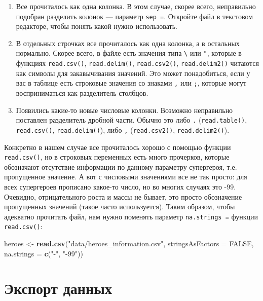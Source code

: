 \documentclass[
]{book}
\newenvironment{Shaded}{\begin{snugshade}}{\end{snugshade}}
\newcommand{\DataTypeTok}[1]{\textcolor[rgb]{0.13,0.29,0.53}{#1}}
\newcommand{\KeywordTok}[1]{\textcolor[rgb]{0.13,0.29,0.53}{\textbf{#1}}}
\newcommand{\NormalTok}[1]{#1}
\newcommand{\OtherTok}[1]{\textcolor[rgb]{0.56,0.35,0.01}{#1}}
\newcommand{\StringTok}[1]{\textcolor[rgb]{0.31,0.60,0.02}{#1}}
\begin{document}
\begin{enumerate}
\def\labelenumi{\arabic{enumi}.}
\setcounter{enumi}{4}
\item
  Все прочиталось как одна колонка. В этом случае, скорее всего, неправильно подобран разделить колонок --- параметр \texttt{sep\ =}. Откройте файл в текстовом редакторе, чтобы понять какой нужно использовать.
\item
  В отдельных строчках все прочиталось как одна колонка, а в остальных нормально. Скорее всего, в файле есть значения типа \texttt{\textbackslash{}} или \texttt{"}, которые в функциях \texttt{read.csv()}, \texttt{read.delim()}, \texttt{read.csv2()}, \texttt{read.delim2()} читаются как символы для закавычивания значений. Это может понадобиться, если у вас в таблице есть строковые значения со знаками \texttt{,} или \texttt{;}, которые могут восприниматься как разделитель столбцов.
\item
  Появились какие-то новые числовые колонки. Возможно неправильно поставлен разделитель дробной части. Обычно это либо \texttt{.} (\texttt{read.table()}, \texttt{read.csv()}, \texttt{read.delim()}), либо \texttt{,} (\texttt{read.csv2()}, \texttt{read.delim2()}).
\end{enumerate}

Конкретно в нашем случае все прочиталось хорошо с помощью функции \texttt{read.csv()}, но в строковых переменных есть много прочерков, которые обозначают отсутствие информации по данному параметру супергероя, т.е. пропущенное значение. А вот с числовыми значениями все не так просто: для всех супергероев прописано какое-то число, но во многих случаях это -99. Очевидно, отрицательного роста и массы не бывает, это просто обозначение пропущенных значений (такое часто используется). Таким образом, чтобы адекватно прочитать файл, нам нужно поменять параметр \texttt{na.strings\ =} функции \texttt{read.csv()}:

\begin{Shaded}
\begin{Highlighting}[]
\NormalTok{heroes <-}\StringTok{ }\KeywordTok{read.csv}\NormalTok{(}\StringTok{"data/heroes_information.csv"}\NormalTok{, }
                   \DataTypeTok{stringsAsFactors =} \OtherTok{FALSE}\NormalTok{,}
                   \DataTypeTok{na.strings =} \KeywordTok{c}\NormalTok{(}\StringTok{"-"}\NormalTok{, }\StringTok{"-99"}\NormalTok{))}
\end{Highlighting}
\end{Shaded}

\hypertarget{export_data}{%
\section{Экспорт данных}\label{export_data}}
\end{document}

